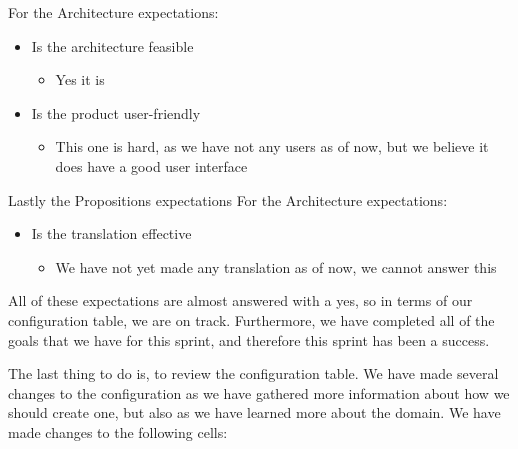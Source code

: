 For the Architecture expectations:
\begin{itemize}
    \item Is the architecture feasible
    \begin{itemize}
        \item Yes it is
    \end{itemize}
    \item Is the product user-friendly
    \begin{itemize}
        \item This one is hard, as we have not any users as of now, but we believe it does have a good user interface
    \end{itemize}
\end{itemize}

Lastly the Propositions expectations
For the Architecture expectations:
\begin{itemize}
    \item Is the translation effective
    \begin{itemize}
        \item We have not yet made any translation as of now, we cannot answer this
    \end{itemize}
\end{itemize}

All of these expectations are almost answered with a yes, so in terms of our configuration table, we are on track.
Furthermore, we have completed all of the goals that we have for this sprint, and therefore this sprint has been a success.

The last thing to do is, to review the configuration table.
We have made several changes to the configuration as we have gathered more information about how we should create one, but also as we have learned more about the domain.
We have made changes to the following cells:

